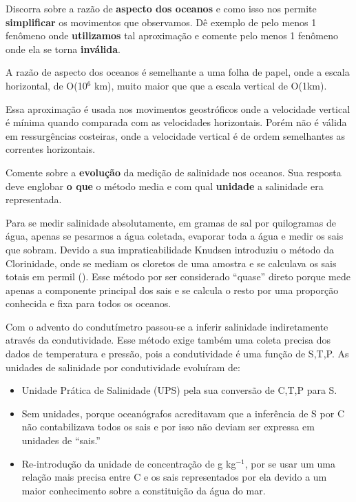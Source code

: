 \documentclass[letterpaper,portuguese,12pt,pdftex]{exam}
\begin{document}
\begin{questions}
\question[5]
Discorra sobre a razão de {\bf aspecto dos oceanos} e como isso nos permite
{\bf simplificar} os movimentos que observamos.  Dê exemplo de pelo menos 1
fenômeno onde {\bf utilizamos} tal aproximação e comente pelo menos 1 fenômeno
onde ela se torna {\bf inválida}.

\begin{solution}
  A razão de aspecto dos oceanos é semelhante a uma folha de papel, onde a
  escala horizontal, de O(10$^{6}$ km), muito maior que que a escala vertical
  de O(1km).

  Essa aproximação é usada nos movimentos geostróficos onde a velocidade
  vertical é mínima quando comparada com as velocidades horizontais.  Porém não
  é válida em ressurgências costeiras, onde a velocidade vertical é de ordem
  semelhantes as correntes horizontais.
\end{solution}


\question[2\half]
Comente sobre a {\bf evolução} da medição de salinidade nos oceanos.  Sua
resposta deve englobar {\bf o que} o método media e com qual {\bf unidade} a
salinidade era representada.

\begin{solution}
  Para se medir salinidade absolutamente, em gramas de sal por quilogramas de
  água, apenas se pesarmos a água coletada, evaporar toda a água e medir os sais
  que sobram.  Devido a sua impraticabilidade Knudsen introduziu o método da
  Clorinidade, onde se mediam os cloretos de uma amostra e se calculava os sais
  totais em permil (\textperthousand{}).  Esse método por ser considerado
  ``quase'' direto porque mede apenas a componente principal dos sais e se
  calcula o resto por uma proporção conhecida e fixa para todos os oceanos.

  Com o advento do condutímetro passou-se a inferir salinidade indiretamente
  através da condutividade.  Esse método exige também uma coleta precisa dos
  dados de temperatura e pressão, pois a condutividade é uma função de S,T,P.
  As unidades de salinidade por condutividade evoluíram de:
  \begin{itemize}
    \item Unidade Prática de Salinidade (UPS) pela sua conversão de C,T,P para S.
    \item Sem unidades, porque oceanógrafos acreditavam que a inferência de S
          por C não contabilizava todos os sais e por isso não deviam ser
          expressa em unidades de ``sais.''
    \item Re-introdução da unidade de concentração de g kg$^{-1}$, por se usar
          um uma relação mais precisa entre C e os sais representados por ela
          devido a um maior conhecimento sobre a constituição da água do mar.
  \end{itemize}
\end{solution}



\end{questions}
\end{document}
